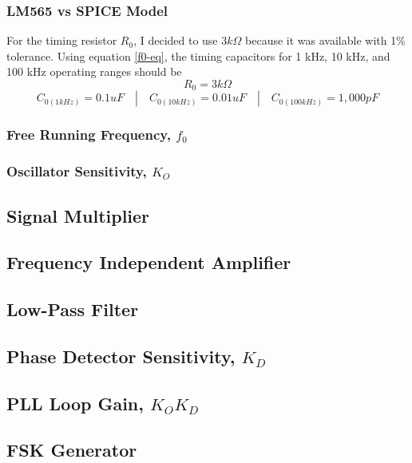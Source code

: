 \documentclass[titlepage, letterpaper, 10.5pt]{article}
\begin{document}
\subsubsection{LM565 vs SPICE Model}

For the timing resistor $R_{0}$, I decided to use $3k\Omega$ because it was available with 1\% tolerance.
Using equation \ref{f0-eq}, the timing capacitors for 1 kHz, 10 kHz, and 100 kHz operating ranges should be
\begin{equation*}
R_{0}=3k\Omega
\end{equation*}
\begin{equation*}
C_{0(1kHz)}=0.1uF \quad | \quad C_{0(10kHz)}=0.01uF \quad | \quad C_{0(100kHz)}=1,000pF
\end{equation*}

\subsubsection{Free Running Frequency, $f_{0}$}

\subsubsection{Oscillator Sensitivity, $K_{O}$}

\subsection{Signal Multiplier}

\subsection{Frequency Independent Amplifier}

\subsection{Low-Pass Filter}

\subsection{Phase Detector Sensitivity, $K_{D}$}

\subsection{PLL Loop Gain, $K_{O}K_{D}$}

\subsection{FSK Generator}
\end{document}
